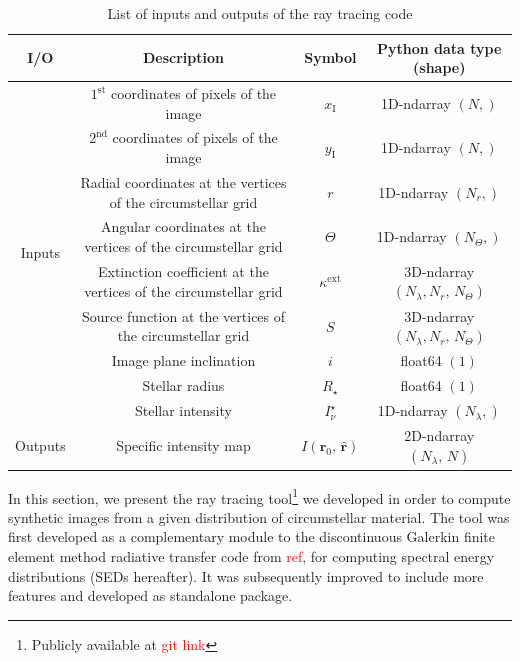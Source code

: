 \documentclass{report}
\newcommand{\rhat}{\hat{\bm{r}}}
\newcommand{\ro}{\bm{r}_0}
\newcommand{\Rstar}{R_\mathrm{\star}}
\newcommand{\Inustar}{I_\nu^\mathrm{\star}}
\newcommand{\xI}{x_\mathrm{I}}
\newcommand{\yI}{y_\mathrm{I}}
\begin{document}
    \begin{table}
        \caption{List of inputs and outputs of the ray tracing code}
        \label{tab:io_ray_tracing}
        \centering
        \begin{tabular}{c c c c}
            \hline\hline 
            I/O & Description & Symbol & Python data type (shape) \\ 
            \hline
            \multirow{9}{*}{Inputs} 
            & $1^\mathrm{st}$ coordinates of pixels of the image & $\xI$ & 1D-ndarray $(N,)$ \\
            & $2^\mathrm{nd}$ coordinates of pixels of the image & $\yI$ & 1D-ndarray $(N,)$ \\
            & Radial coordinates at the vertices of the circumstellar grid & $r$ & 1D-ndarray $(N_r,)$ \\
            & Angular coordinates at the vertices of the circumstellar grid & $\Theta$ & 1D-ndarray $(N_\Theta,)$ \\
            & Extinction coefficient at the vertices of the circumstellar grid & $\kappa^\mathrm{ext}$ & 3D-ndarray $(N_\lambda, N_r, \, N_\Theta)$ \\
            & Source function at the vertices of the circumstellar grid & $S$ & 3D-ndarray $(N_\lambda, N_r, \, N_\Theta)$ \\
            & Image plane inclination & $i$ & float64 $(1)$ \\
            & Stellar radius & $\Rstar$ & float64 $(1)$ \\
            & Stellar intensity & $\Inustar$ & 1D-ndarray $(N_\lambda,)$ \\
            \hline
            Outputs & Specific intensity map & $I\left(\ro, \, \rhat \right)$ & 2D-ndarray $(N_\lambda, \, N)$ \\
            \hline
        \end{tabular}
    \end{table}
    
    In this section, we present the ray tracing tool\footnote{Publicly available at \textcolor{red}{git link}} we developed in order to compute synthetic images from a given distribution of circumstellar material. The tool was first developed as a complementary module to the discontinuous Galerkin finite element method radiative transfer code from \textcolor{red}{ref}, for computing spectral energy distributions (SEDs hereafter). It was subsequently improved to include more features and developed as standalone package. 
\end{document}
